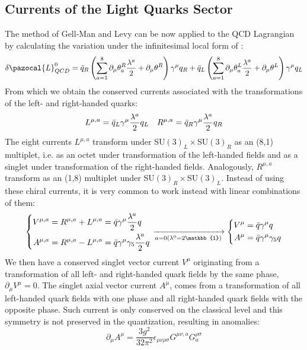 \documentclass[../main.tex]{subfiles}
\begin{document}
\subsection{Currents of the Light Quarks Sector}
The method of Gell-Man and Levy can be now applied to the QCD Lagrangian by calculating the variation under the infinitesimal local form of :
\[
\delta\pazocal{L}_{QCD}^0=\Bar{q}_R\left(\sum_{a=1}^8\partial_\mu\theta_a^R\frac{\lambda^a}{2}+\partial_\mu\theta^R\right)\gamma^\mu q_R+\Bar{q}_L\left(\sum_{a=1}^8\partial_\mu\theta_a^L\frac{\lambda^a}{2}+\partial_\mu\theta^L\right)\gamma^\mu q_L
\]
From which we obtain the conserved currents associated with the transformations of the left- and right-handed quarks:
\[
L^{\mu,a}=\Bar{q}_L\gamma^\mu\frac{\lambda^a}{2}q_L \quad R^{\mu,a}=\Bar{q}_R\gamma^\mu\frac{\lambda^a}{2}q_R
\]
The eight currents $L^{\mu,a}$ transform under SU$(3)_L\times$SU$(3)_R$ as an (8,1) multiplet, i.e. as an octet under transformation of the left-handed fields and as a singlet under transformation of the right-handed fields. Analogously, $R^{\mu,a}$ transform as an (1,8) multiplet under SU$(3)_R\times$SU$(3)_L$. Instead of using these chiral currents, it is very common to work instead with linear combinations of them:
\[
\left\{
\begin{aligned}
V^{\mu,a}&=R^{\mu,a}+L^{\mu,a}=\Bar{q}\gamma^\mu\frac{\lambda^a}{2}q\\
A^{\mu,a}&=R^{\mu,a}-L^{\mu,a}=\Bar{q}\gamma^\mu\gamma_5\frac{\lambda^a}{2}q
\end{aligned}
\right.
\xrightarrow[a=0 (\lambda^0=2\mathbb{1})]{}
\left\{
\begin{aligned}
V^\mu&=\Bar{q}\gamma^\mu q\\
A^\mu&=\Bar{q}\gamma^\mu\gamma_5q
\end{aligned}
\right.
\]
We then have a conserved singlet vector current $V^\mu$ originating from a transformation of all left- and right-handed quark fields by the same phase, $\partial_\mu V^\mu=0$. The singlet axial vector current $A^\mu$, comes from a transformation of all left-handed quark fields with one phase and all right-handed quark fields with the opposite phase. Such current is only conserved on the classical level and this symmetry is not preserved in the quantization, resulting in anomalies:
\[
\partial_\mu A^\mu=\frac{3g^2}{32\pi^2}\epsilon_{\mu\nu\rho\sigma}G^{\mu\nu,a}G^{\rho\sigma}_a
\]
\end{document}
